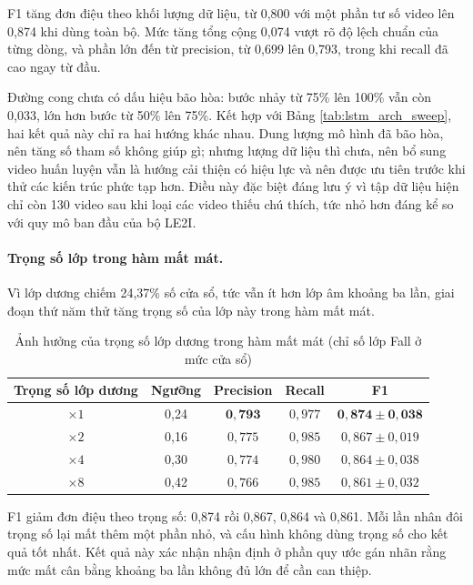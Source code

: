 F1 tăng đơn điệu theo khối lượng dữ liệu, từ 0,800 với một phần tư số video lên 0,874 khi dùng toàn bộ. Mức tăng tổng cộng 0,074 vượt rõ độ lệch chuẩn của từng dòng, và phần lớn đến từ precision, từ 0,699 lên 0,793, trong khi recall đã cao ngay từ đầu.

Đường cong chưa có dấu hiệu bão hòa: bước nhảy từ 75\% lên 100\% vẫn còn 0,033, lớn hơn bước từ 50\% lên 75\%. Kết hợp với Bảng \ref{tab:lstm_arch_sweep}, hai kết quả này chỉ ra hai hướng khác nhau. Dung lượng mô hình đã bão hòa, nên tăng số tham số không giúp gì; nhưng lượng dữ liệu thì chưa, nên bổ sung video huấn luyện vẫn là hướng cải thiện có hiệu lực và nên được ưu tiên trước khi thử các kiến trúc phức tạp hơn. Điều này đặc biệt đáng lưu ý vì tập dữ liệu hiện chỉ còn 130 video sau khi loại các video thiếu chú thích, tức nhỏ hơn đáng kể so với quy mô ban đầu của bộ LE2I.

\paragraph{Trọng số lớp trong hàm mất mát.}
Vì lớp dương chiếm 24,37\% số cửa sổ, tức vẫn ít hơn lớp âm khoảng ba lần, giai đoạn thứ năm thử tăng trọng số của lớp này trong hàm mất mát.

\begin{table}[htbp]
\centering
\caption{Ảnh hưởng của trọng số lớp dương trong hàm mất mát (chỉ số lớp Fall ở mức cửa sổ)}
\label{tab:lstm_class_weight}
\small
\begin{tabular}{|c|c|c|c|c|}
\hline
\textbf{Trọng số lớp dương} & \textbf{Ngưỡng} & \textbf{Precision} & \textbf{Recall} & \textbf{F1} \\
\hline
$\times 1$ & 0,24 & $\mathbf{0{,}793}$ & $0{,}977$ & $\mathbf{0{,}874\pm0{,}038}$ \\
\hline
$\times 2$ & 0,16 & $0{,}775$ & $0{,}985$ & $0{,}867\pm0{,}019$ \\
\hline
$\times 4$ & 0,30 & $0{,}774$ & $0{,}980$ & $0{,}864\pm0{,}038$ \\
\hline
$\times 8$ & 0,42 & $0{,}766$ & $0{,}985$ & $0{,}861\pm0{,}032$ \\
\hline
\end{tabular}
\end{table}

F1 giảm đơn điệu theo trọng số: 0,874 rồi 0,867, 0,864 và 0,861. Mỗi lần nhân đôi trọng số lại mất thêm một phần nhỏ, và cấu hình không dùng trọng số cho kết quả tốt nhất. Kết quả này xác nhận nhận định ở phần quy ước gán nhãn rằng mức mất cân bằng khoảng ba lần không đủ lớn để cần can thiệp.

